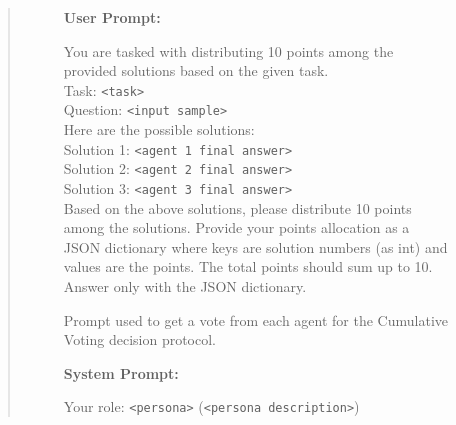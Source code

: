 \documentclass[11pt]{article}
\begin{document}
\begin{abstract}
\begin{figure}[H]
\begin{combinedprompt}
    \textbf{User Prompt:} \\
    \begingroup
    \colorbox{usercolor}{\parbox{\dimexpr\linewidth-2\fboxsep\relax}{
    You are tasked with distributing 10 points among the provided solutions based on the given task.\\
    Task: \texttt{<task>}\\
    Question: \texttt{<input sample>}\\
    Here are the possible solutions:\\
    Solution 1: \texttt{<agent 1 final answer>}\\
    Solution 2: \texttt{<agent 2 final answer>}\\
    Solution 3: \texttt{<agent 3 final answer>}\\
    Based on the above solutions, please distribute 10 points among the solutions. Provide your points allocation as a JSON dictionary where keys are solution numbers (as int) and values are the points. The total points should sum up to 10. Answer only with the JSON dictionary.
    }}
    \endgroup
\end{combinedprompt}
    \caption{Prompt used to get a vote from each agent for the Cumulative Voting decision protocol.}
    \label{fig:cumulative_voting_prompt}
\end{figure}

\begin{figure}[H]
    \centering
    \begin{combinedprompt}
    \textbf{System Prompt:} \\
    \begingroup
    \colorbox{systemcolor}{\parbox{\dimexpr\linewidth-2\fboxsep\relax}{
    Your role: \texttt{<persona>} (\texttt{<persona description>})
    }}
    \endgroup

    \vspace{0.4em} %


\end{combinedprompt}
\end{figure}
\end{abstract}
\end{document}
